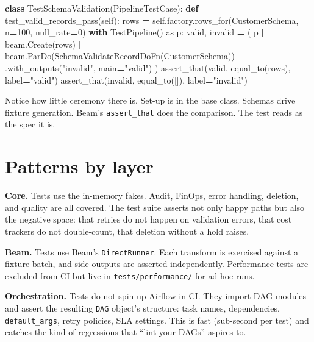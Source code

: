 \documentclass[
  11pt,
  british,
  oneside]{book}
\newenvironment{Shaded}{\begin{snugshade}}{\end{snugshade}}
\newcommand{\ControlFlowTok}[1]{\textcolor[rgb]{0.13,0.29,0.53}{\textbf{#1}}}
\newcommand{\DecValTok}[1]{\textcolor[rgb]{0.00,0.00,0.81}{#1}}
\newcommand{\ImportTok}[1]{#1}
\newcommand{\KeywordTok}[1]{\textcolor[rgb]{0.13,0.29,0.53}{\textbf{#1}}}
\newcommand{\NormalTok}[1]{#1}
\newcommand{\OperatorTok}[1]{\textcolor[rgb]{0.81,0.36,0.00}{\textbf{#1}}}
\newcommand{\StringTok}[1]{\textcolor[rgb]{0.31,0.60,0.02}{#1}}
\newcommand{\VariableTok}[1]{\textcolor[rgb]{0.00,0.00,0.00}{#1}}
\begin{document}
\begin{Shaded}
\begin{Highlighting}[]
\KeywordTok{class}\NormalTok{ TestSchemaValidation(PipelineTestCase):}
    \KeywordTok{def}\NormalTok{ test\_valid\_records\_pass(}\VariableTok{self}\NormalTok{):}
\NormalTok{        rows }\OperatorTok{=} \VariableTok{self}\NormalTok{.factory.rows\_for(CustomerSchema, n}\OperatorTok{=}\DecValTok{100}\NormalTok{, null\_rate}\OperatorTok{=}\DecValTok{0}\NormalTok{)}
        \ControlFlowTok{with}\NormalTok{ TestPipeline() }\ImportTok{as}\NormalTok{ p:}
\NormalTok{            valid, invalid }\OperatorTok{=}\NormalTok{ (}
\NormalTok{                p }\OperatorTok{|}\NormalTok{ beam.Create(rows)}
                  \OperatorTok{|}\NormalTok{ beam.ParDo(SchemaValidateRecordDoFn(CustomerSchema))}
\NormalTok{                       .with\_outputs(}\StringTok{"invalid"}\NormalTok{, main}\OperatorTok{=}\StringTok{"valid"}\NormalTok{)}
\NormalTok{            )}
\NormalTok{            assert\_that(valid, equal\_to(rows), label}\OperatorTok{=}\StringTok{"valid"}\NormalTok{)}
\NormalTok{            assert\_that(invalid, equal\_to([]), label}\OperatorTok{=}\StringTok{"invalid"}\NormalTok{)}
\end{Highlighting}
\end{Shaded}

Notice how little ceremony there is. Set-up is in the base class.
Schemas drive fixture generation. Beam's \texttt{assert\_that} does the
comparison. The test reads as the spec it is.

\hypertarget{patterns-by-layer}{%
\section{Patterns by layer}\label{patterns-by-layer}}

\textbf{Core.} Tests use the in-memory fakes. Audit, FinOps, error
handling, deletion, and quality are all covered. The test suite asserts
not only happy paths but also the negative space: that retries do not
happen on validation errors, that cost trackers do not double-count,
that deletion without a hold raises.

\textbf{Beam.} Tests use Beam's \texttt{DirectRunner}. Each transform is
exercised against a fixture batch, and side outputs are asserted
independently. Performance tests are excluded from CI but live in
\texttt{tests/performance/} for ad-hoc runs.

\textbf{Orchestration.} Tests do not spin up Airflow in CI. They import
DAG modules and assert the resulting \texttt{DAG} object's structure:
task names, dependencies, \texttt{default\_args}, retry policies, SLA
settings. This is fast (sub-second per test) and catches the kind of
regressions that ``lint your DAGs'' aspires to.
\end{document}
